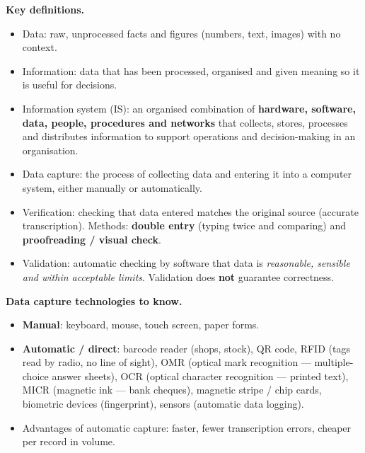 \documentclass[11pt]{article}
\newcommand{\cle}[1]{{\popxbold\color{popdark}#1}}
\begin{document}
\begin{bilan}
\textbf{Key definitions.}
\begin{itemize}
  \item \cle{Data}: raw, unprocessed facts and figures (numbers, text, images) with no context.
  \item \cle{Information}: data that has been processed, organised and given meaning so it is useful for decisions.
  \item \cle{Information system (IS)}: an organised combination of \textbf{hardware, software, data, people, procedures and networks} that collects, stores, processes and distributes information to support operations and decision-making in an organisation.
  \item \cle{Data capture}: the process of collecting data and entering it into a computer system, either manually or automatically.
  \item \cle{Verification}: checking that data entered matches the original source (accurate transcription). Methods: \textbf{double entry} (typing twice and comparing) and \textbf{proofreading / visual check}.
  \item \cle{Validation}: automatic checking by software that data is \emph{reasonable, sensible and within acceptable limits}. Validation does \textbf{not} guarantee correctness.
\end{itemize}

\textbf{Data capture technologies to know.}
\begin{itemize}
  \item \textbf{Manual}: keyboard, mouse, touch screen, paper forms.
  \item \textbf{Automatic / direct}: \cle{barcode reader} (shops, stock), \cle{QR code}, \cle{RFID} (tags read by radio, no line of sight), \cle{OMR} (optical mark recognition — multiple-choice answer sheets), \cle{OCR} (optical character recognition — printed text), \cle{MICR} (magnetic ink — bank cheques), \cle{magnetic stripe / chip cards}, \cle{biometric} devices (fingerprint), \cle{sensors} (automatic data logging).
  \item Advantages of automatic capture: faster, fewer transcription errors, cheaper per record in volume.
\end{itemize}


\end{bilan}
\end{document}
